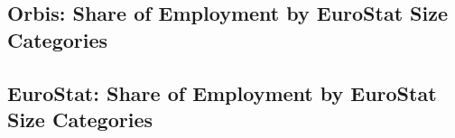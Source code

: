 \documentclass[12pt,notitlepage]{article}
\begin{document}
\subsection{Orbis: Share of Employment by EuroStat Size Categories}
\begin{table}[!htpb]
\caption{Share of Employment by Size Categories}
\end{table}



\subsection{EuroStat: Share of Employment by EuroStat Size Categories}
\begin{table}[!htpb]
\caption{Share of Employment by Size Categories}
\end{table}

\clearpage
\end{document}
